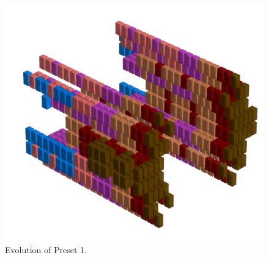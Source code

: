 \clearpage                                                                 
\begin{figure}[H]                                                          
  \centering                                                             
  \begin{adjustbox}{width=14cm,center}                                   
  \includegraphics[width=14cm]{src/presets/pattern1-45.png}%
  \end{adjustbox}                                                        
\caption{Evolution of Preset 1.}                                           
\end{figure}                                                               
\clearpage                                                                 
                                                                           
